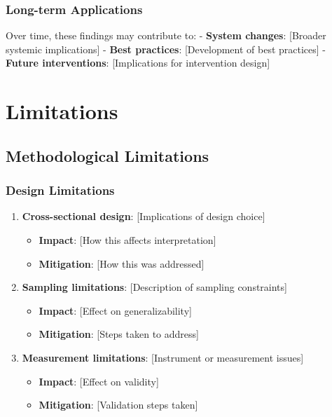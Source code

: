 \documentclass[
  12pt,
  letterpaper,
  12pt,
  letterpaper,
  oneside]{report}
\providecommand{\tightlist}{%
  \setlength{\itemsep}{0pt}\setlength{\parskip}{0pt}}
\begin{document}
\subsubsection{Long-term Applications}\label{long-term-applications}

Over time, these findings may contribute to: - \textbf{System changes}:
{[}Broader systemic implications{]} - \textbf{Best practices}:
{[}Development of best practices{]} - \textbf{Future interventions}:
{[}Implications for intervention design{]}

\section{Limitations}\label{limitations-1}

\subsection{Methodological
Limitations}\label{methodological-limitations-1}

\subsubsection{Design Limitations}\label{design-limitations}

\begin{enumerate}
\def\labelenumi{\arabic{enumi}.}
\tightlist
\item
  \textbf{Cross-sectional design}: {[}Implications of design choice{]}

  \begin{itemize}
  \tightlist
  \item
    \textbf{Impact}: {[}How this affects interpretation{]}
  \item
    \textbf{Mitigation}: {[}How this was addressed{]}
  \end{itemize}
\item
  \textbf{Sampling limitations}: {[}Description of sampling
  constraints{]}

  \begin{itemize}
  \tightlist
  \item
    \textbf{Impact}: {[}Effect on generalizability{]}
  \item
    \textbf{Mitigation}: {[}Steps taken to address{]}
  \end{itemize}
\item
  \textbf{Measurement limitations}: {[}Instrument or measurement
  issues{]}

  \begin{itemize}
  \tightlist
  \item
    \textbf{Impact}: {[}Effect on validity{]}
  \item
    \textbf{Mitigation}: {[}Validation steps taken{]}
  \end{itemize}
\end{enumerate}
\end{document}
